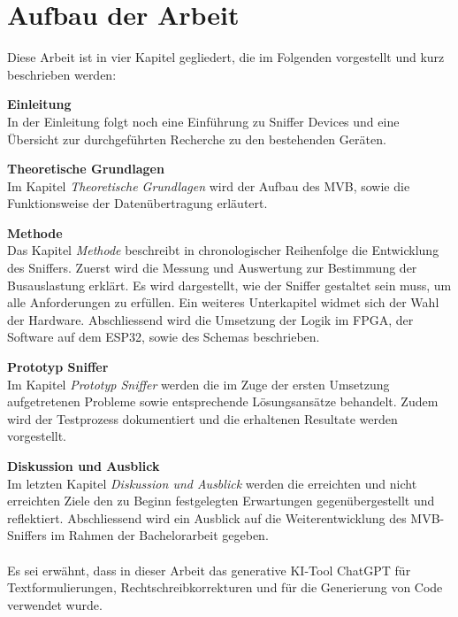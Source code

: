 
\section{Aufbau der Arbeit}
\label{Aufbau der Arbeit} %
Diese Arbeit ist in vier Kapitel gegliedert, die im Folgenden vorgestellt und kurz beschrieben werden:

\textbf{Einleitung}\\
In der Einleitung folgt noch eine Einführung zu Sniffer Devices und eine Übersicht zur durchgeführten Recherche zu den bestehenden Geräten.

\textbf{Theoretische Grundlagen}\\
Im Kapitel \textit{Theoretische Grundlagen} wird der Aufbau des MVB, sowie die Funktionsweise der Datenübertragung erläutert.

\textbf{Methode}\\
Das Kapitel \textit{Methode} beschreibt in chronologischer Reihenfolge die Entwicklung des Sniffers. Zuerst wird die Messung und Auswertung zur Bestimmung der Busauslastung erklärt. Es wird dargestellt, wie der Sniffer gestaltet sein muss, um alle Anforderungen zu erfüllen. Ein weiteres Unterkapitel widmet sich der Wahl der Hardware. Abschliessend wird die Umsetzung der Logik im FPGA, der Software auf dem ESP32, sowie des Schemas beschrieben.

\textbf{Prototyp Sniffer}\\
Im Kapitel \textit{Prototyp Sniffer} werden die im Zuge der ersten Umsetzung aufgetretenen Probleme sowie entsprechende Lösungsansätze behandelt. Zudem wird der Testprozess dokumentiert und die erhaltenen Resultate werden vorgestellt.

\textbf{Diskussion und Ausblick}\\
Im letzten Kapitel \textit{Diskussion und Ausblick} werden die erreichten und nicht erreichten Ziele den zu Beginn festgelegten Erwartungen gegenübergestellt und reflektiert. Abschliessend wird ein Ausblick auf die Weiterentwicklung des MVB-Sniffers im Rahmen der Bachelorarbeit gegeben.\\
\\
Es sei erwähnt, dass in dieser Arbeit das generative KI-Tool ChatGPT für Textformulierungen, Rechtschreibkorrekturen und für die Generierung von Code verwendet wurde.